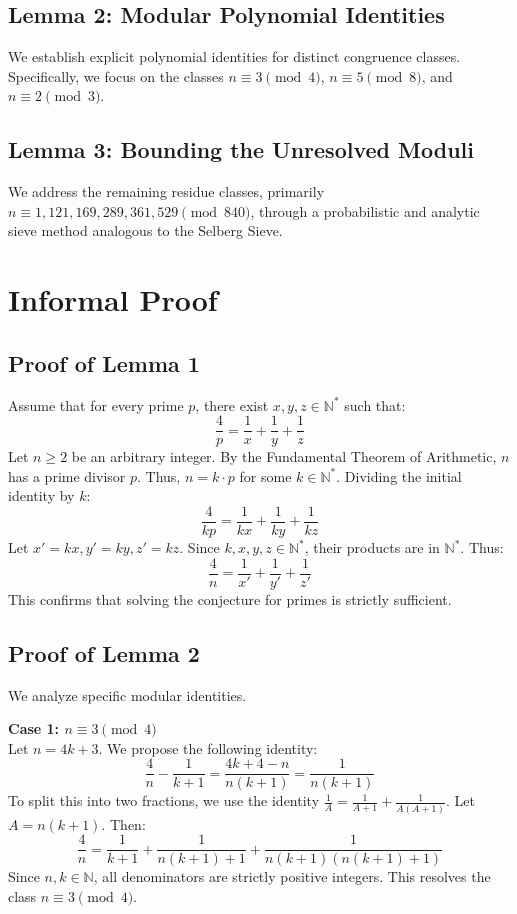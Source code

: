 \documentclass[12pt, a4paper]{article}
\begin{document}
\subsection{Lemma 2: Modular Polynomial Identities}
We establish explicit polynomial identities for distinct congruence classes. Specifically, we focus on the classes $n \equiv 3 \pmod 4$, $n \equiv 5 \pmod 8$, and $n \equiv 2 \pmod 3$.

\subsection{Lemma 3: Bounding the Unresolved Moduli}
We address the remaining residue classes, primarily $n \equiv 1, 121, 169, 289, 361, 529 \pmod{840}$, through a probabilistic and analytic sieve method analogous to the Selberg Sieve.

\newpage
\section{Informal Proof}

\subsection{Proof of Lemma 1}
Assume that for every prime $p$, there exist $x, y, z \in \mathbb{N}^*$ such that:
\begin{equation}
\frac{4}{p} = \frac{1}{x} + \frac{1}{y} + \frac{1}{z}
\end{equation}
Let $n \ge 2$ be an arbitrary integer. By the Fundamental Theorem of Arithmetic, $n$ has a prime divisor $p$. Thus, $n = k \cdot p$ for some $k \in \mathbb{N}^*$.
Dividing the initial identity by $k$:
\begin{equation}
\frac{4}{kp} = \frac{1}{kx} + \frac{1}{ky} + \frac{1}{kz}
\end{equation}
Let $x' = kx, y' = ky, z' = kz$. Since $k, x, y, z \in \mathbb{N}^*$, their products are in $\mathbb{N}^*$. Thus:
\begin{equation}
\frac{4}{n} = \frac{1}{x'} + \frac{1}{y'} + \frac{1}{z'}
\end{equation}
This confirms that solving the conjecture for primes is strictly sufficient.

\subsection{Proof of Lemma 2}
We analyze specific modular identities.

\textbf{Case 1: $n \equiv 3 \pmod 4$} \\
Let $n = 4k + 3$. We propose the following identity:
\begin{equation}
\frac{4}{n} - \frac{1}{k+1} = \frac{4k+4 - n}{n(k+1)} = \frac{1}{n(k+1)}
\end{equation}
To split this into two fractions, we use the identity $\frac{1}{A} = \frac{1}{A+1} + \frac{1}{A(A+1)}$. Let $A = n(k+1)$. Then:
\begin{equation}
\frac{4}{n} = \frac{1}{k+1} + \frac{1}{n(k+1)+1} + \frac{1}{n(k+1)(n(k+1)+1)}
\end{equation}
Since $n, k \in \mathbb{N}$, all denominators are strictly positive integers. This resolves the class $n \equiv 3 \pmod 4$.
\end{document}
